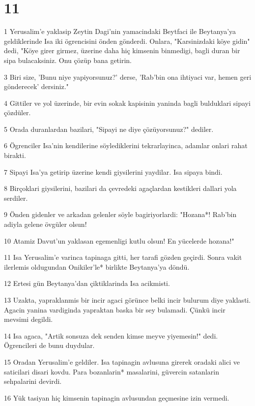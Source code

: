\chapter{11}

\par 1 Yerusalim'e yaklasip Zeytin Dagi'nin yamacindaki Beytfaci ile Beytanya'ya geldiklerinde Isa iki ögrencisini önden gönderdi. Onlara, "Karsinizdaki köye gidin" dedi, "Köye girer girmez, üzerine daha hiç kimsenin binmedigi, bagli duran bir sipa bulacaksiniz. Onu çözüp bana getirin.
\par 3 Biri size, 'Bunu niye yapiyorsunuz?' derse, 'Rab'bin ona ihtiyaci var, hemen geri gönderecek' dersiniz."
\par 4 Gittiler ve yol üzerinde, bir evin sokak kapisinin yaninda bagli bulduklari sipayi çözdüler.
\par 5 Orada duranlardan bazilari, "Sipayi ne diye çözüyorsunuz?" dediler.
\par 6 Ögrenciler Isa'nin kendilerine söylediklerini tekrarlayinca, adamlar onlari rahat birakti.
\par 7 Sipayi Isa'ya getirip üzerine kendi giysilerini yaydilar. Isa sipaya bindi.
\par 8 Birçoklari giysilerini, bazilari da çevredeki agaçlardan kestikleri dallari yola serdiler.
\par 9 Önden gidenler ve arkadan gelenler söyle bagiriyorlardi: "Hozana*! Rab'bin adiyla gelene övgüler olsun!
\par 10 Atamiz Davut'un yaklasan egemenligi kutlu olsun! En yücelerde hozana!"
\par 11 Isa Yerusalim'e varinca tapinaga gitti, her tarafi gözden geçirdi. Sonra vakit ilerlemis oldugundan Onikiler'le* birlikte Beytanya'ya döndü.
\par 12 Ertesi gün Beytanya'dan çiktiklarinda Isa acikmisti.
\par 13 Uzakta, yapraklanmis bir incir agaci görünce belki incir bulurum diye yaklasti. Agacin yanina vardiginda yapraktan baska bir sey bulamadi. Çünkü incir mevsimi degildi.
\par 14 Isa agaca, "Artik sonsuza dek senden kimse meyve yiyemesin!" dedi. Ögrencileri de bunu duydular.
\par 15 Oradan Yerusalim'e geldiler. Isa tapinagin avlusuna girerek oradaki alici ve saticilari disari kovdu. Para bozanlarin* masalarini, güvercin satanlarin sehpalarini devirdi.
\par 16 Yük tasiyan hiç kimsenin tapinagin avlusundan geçmesine izin vermedi.
